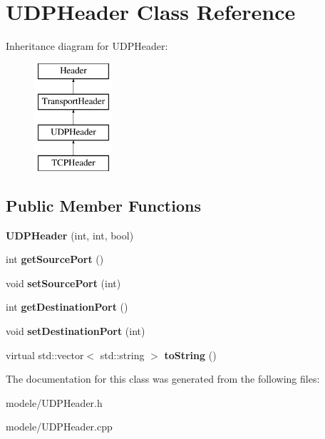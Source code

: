 \hypertarget{class_u_d_p_header}{\section{U\-D\-P\-Header Class Reference}
\label{class_u_d_p_header}
}
Inheritance diagram for U\-D\-P\-Header\-:\begin{figure}[H]
\begin{center}
\leavevmode
\includegraphics[height=4.000000cm]{class_u_d_p_header}
\end{center}
\end{figure}
\subsection*{Public Member Functions}
\begin{DoxyCompactItemize}
\item 
\hypertarget{class_u_d_p_header_a84deeef8bdc9b94ad0260f7b4a036136}{{\bfseries U\-D\-P\-Header} (int, int, bool)}\label{class_u_d_p_header_a84deeef8bdc9b94ad0260f7b4a036136}

\item 
\hypertarget{class_u_d_p_header_a3b31658cf040a7720d29d39ba7791196}{int {\bfseries get\-Source\-Port} ()}\label{class_u_d_p_header_a3b31658cf040a7720d29d39ba7791196}

\item 
\hypertarget{class_u_d_p_header_ac19e86b26723acc3139ff3858f05f1b6}{void {\bfseries set\-Source\-Port} (int)}\label{class_u_d_p_header_ac19e86b26723acc3139ff3858f05f1b6}

\item 
\hypertarget{class_u_d_p_header_accfb2990b636b3fd0b5b4ac2490a7560}{int {\bfseries get\-Destination\-Port} ()}\label{class_u_d_p_header_accfb2990b636b3fd0b5b4ac2490a7560}

\item 
\hypertarget{class_u_d_p_header_aa07ffe2a1671cc12ca31d69c277900a4}{void {\bfseries set\-Destination\-Port} (int)}\label{class_u_d_p_header_aa07ffe2a1671cc12ca31d69c277900a4}

\item 
\hypertarget{class_u_d_p_header_a48e539ed71abf18cf67ac60dfa77350a}{virtual std\-::vector$<$ std\-::string $>$ {\bfseries to\-String} ()}\label{class_u_d_p_header_a48e539ed71abf18cf67ac60dfa77350a}

\end{DoxyCompactItemize}


The documentation for this class was generated from the following files\-:\begin{DoxyCompactItemize}
\item 
modele/U\-D\-P\-Header.\-h\item 
modele/U\-D\-P\-Header.\-cpp\end{DoxyCompactItemize}
